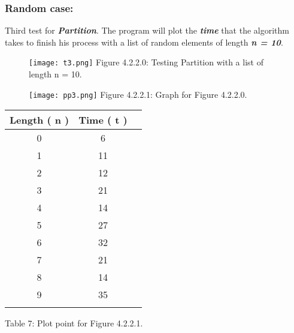 {\bfseries\itshape\color{armygreen}{Observation:}} {\itshape{}} \hfill \break

{\bfseries\itshape\color{armygreen}{Observation:}} {\itshape{}} \hfill \break

\pagebreak

\subsubsection{Random case:}

Third test for {\bfseries\itshape Partition}. The program will plot the {\bfseries\itshape time} that the algorithm takes to finish his process with a list of random elements of length {\bfseries\itshape n = 10}. \hfill \break

\begin{figure}[H]
\texttt{[image: t3.png]}
\centering \linebreak \linebreak Figure 4.2.2.0: Testing Partition with a list of length n = 10.
\end{figure} \hfill 

\begin{multicols}{2}
\begin{figure}[H]
\texttt{[image: pp3.png]}
\centering \linebreak \linebreak Figure 4.2.2.1: Graph for Figure 4.2.2.0.
\end{figure} \hfill

\begin{center}
\begin{tabular}[.5cm]{ c c c }
\toprule
Length ( n ) & Time ( t ) \\
\midrule
0 & 6 \\
\cmidrule {1-2}
1 & 11 \\
\cmidrule {1-2}
2 & 12 \\
\cmidrule {1-2}
3 & 21 \\
\cmidrule {1-2}
4 & 14 \\
\cmidrule {1-2}
5 & 27 \\
\cmidrule {1-2}
6 & 32 \\
\cmidrule {1-2}
7 & 21 \\
\cmidrule {1-2}
8 & 14 \\
\cmidrule {1-2}
9 & 35 \\
\bottomrule
\linebreak
\end{tabular}
\linebreak \linebreak Table 7: Plot point for Figure 4.2.2.1.
\end{center}
\end{multicols}

